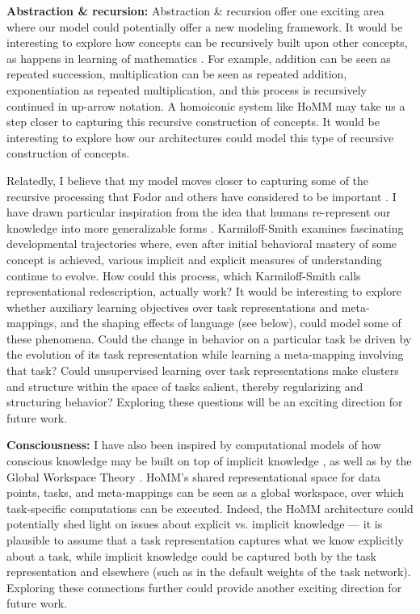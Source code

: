 \textbf{Abstraction \& recursion:} Abstraction \& recursion offer one exciting area where our model could potentially offer a new modeling framework. It would be interesting to explore how concepts can be recursively built upon other concepts, as happens in learning of mathematics \citep{Wilensky1991, Hazzan1999, Lampinen2017b}. For example, addition can be seen as repeated succession, multiplication can be seen as repeated addition, exponentiation as repeated multiplication, and this process is recursively continued in up-arrow notation. A homoiconic system like HoMM may take us a step closer to capturing this recursive construction of concepts. It would be interesting to explore how our architectures could model this type of recursive construction of concepts. \par 

Relatedly, I believe that my model moves closer to capturing some of the recursive processing that Fodor and others have considered to be important \citep[e.g.][]{Fodor2008lot2}. I have drawn particular inspiration from the idea that humans re-represent our knowledge into more generalizable forms \citep{Karmiloff-Smith1986,Clark1993}. Karmiloff-Smith examines fascinating developmental trajectories where, even after initial behavioral mastery of some concept is achieved, various implicit and explicit measures of understanding continue to evolve. How could this process, which Karmiloff-Smith calls representational redescription, actually work? It would be interesting to explore whether auxiliary learning objectives over task representations and meta-mappings, and the shaping effects of language (see below), could model some of these phenomena. Could the change in behavior on a particular task be driven by the evolution of its task representation while learning a meta-mapping involving that task? Could unsupervised learning over task representations make clusters and structure within the space of tasks salient, thereby regularizing and structuring behavior? Exploring these questions will be an exciting direction for future work. \par 

\textbf{Consciousness:} I have also been inspired by computational models of how conscious knowledge may be built on top of implicit knowledge \citep{Cleeremans2014}, as well as by the Global Workspace Theory \citep{Baars2005}. HoMM's shared representational space for data points, tasks, and meta-mappings can be seen as a global workspace, over which task-specific computations can be executed. Indeed, the HoMM architecture could potentially shed light on issues about explicit vs. implicit knowledge --- it is plausible to assume that a task representation captures what we know explicitly about a task, while implicit knowledge could be captured both by the task representation and elsewhere (such as in the default weights of the task network). Exploring these connections further could provide another exciting direction for future work. \par

